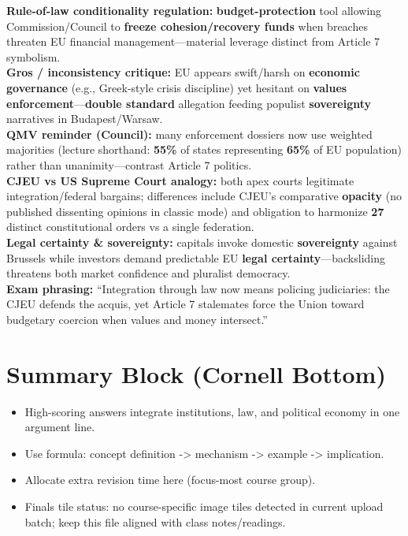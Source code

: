\documentclass[10pt,a4paper]{article}
\begin{document}
{\textbf{Rule-of-law conditionality regulation:} \textbf{budget-protection} tool allowing Commission/Council to \textbf{freeze cohesion/recovery funds} when breaches threaten EU financial management---material leverage distinct from Article 7 symbolism.\\
\textbf{Gros / inconsistency critique:} EU appears swift/harsh on \textbf{economic governance} (e.g., Greek-style crisis discipline) yet hesitant on \textbf{values enforcement}---\textbf{double standard} allegation feeding populist \textbf{sovereignty} narratives in Budapest/Warsaw.\\
\textbf{QMV reminder (Council):} many enforcement dossiers now use weighted majorities (lecture shorthand: \textbf{55\%} of states representing \textbf{65\%} of EU population) rather than unanimity---contrast Article 7 politics.\\
\textbf{CJEU vs US Supreme Court analogy:} both apex courts legitimate integration/federal bargains; differences include CJEU's comparative \textbf{opacity} (no published dissenting opinions in classic mode) and obligation to harmonize \textbf{27} distinct constitutional orders vs a single federation.\\
\textbf{Legal certainty \& sovereignty:} capitals invoke domestic \textbf{sovereignty} against Brussels while investors demand predictable EU \textbf{legal certainty}---backsliding threatens both market confidence and pluralist democracy.\\
\textbf{Exam phrasing:} ``Integration through law now means policing judiciaries: the CJEU defends the acquis, yet Article 7 stalemates force the Union toward budgetary coercion when values and money intersect.''
}

\section*{Summary Block (Cornell Bottom)}
\begin{itemize}
  \item High-scoring answers integrate institutions, law, and political economy in one argument line.
  \item Use formula: concept definition -> mechanism -> example -> implication.
  \item Allocate extra revision time here (focus-most course group).
  \item Finals tile status: no course-specific image tiles detected in current upload batch; keep this file aligned with class notes/readings.
\end{itemize}
\end{document}
